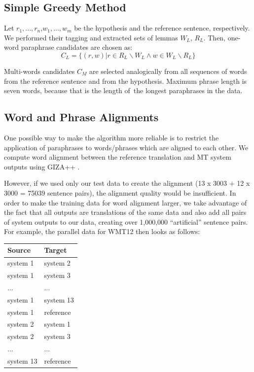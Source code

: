 \documentclass[11pt]{article}
\def\equo#1{``#1''}
\begin{document}
\subsection*{Simple Greedy Method}
Let $ r_1,..., r_n $,$ w_1,...,w_m $ be the hypothesis and the reference 
sentence, respectively. We performed their tagging and extracted sets of lemmas 
$ W_{L} $, $ R_{L} $. Then, one-word paraphrase candidates are chosen as:
$$ C_{L} = \lbrace (r,w) | r \in R_{L} \smallsetminus W_{L} \wedge w \in W_{L}
\smallsetminus R_{L}  \rbrace $$

Multi-words candidates $ C_M $ are selected analogically from all sequences 
of words from the reference sentence and from the hypothesis. Maximum phrase 
length is seven words, because that is the length of~the longest paraphrases in 
the data. %
%

\subsection*{Word and Phrase Alignments}
One possible way to make the algorithm more reliable is to restrict the 
application of paraphrases to words/phrases which are aligned to each other. We 
compute word alignment between the reference translation and MT system outputs 
using GIZA++ \cite{gizapp}.

However, if we used only our test data to create the alignment (13 x 3003 + 12 
x 3000 = 75039 sentence pairs), the alignment quality would be insufficient. In 
order to make the training data for word alignment larger, we take advantage of 
the fact that all outputs are translations of the same data and also add all 
pairs of system outputs to our data, creating over 1,000,000 \equo{artificial} 
sentence pairs. For example, the parallel data for WMT12 then looks as follows:

\begin{center}
\begin{tabular}{ll}
Source & Target \\
\hline
system 1 & system 2 \\
system 1 & system 3 \\
... & ...\\
system 1 & system 13 \\
system 1 & reference \\
system 2 & system 1 \\
system 2 & system 3 \\
... & ... \\
system 13 & reference \\
\end{tabular}
\end{center}
\end{document}
